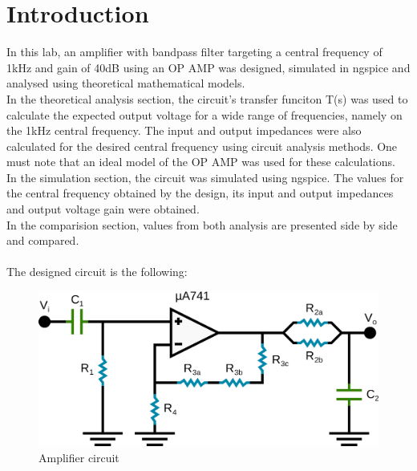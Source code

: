 \section{Introduction}
\label{sec:intro}
In this lab, an amplifier with bandpass filter targeting a central frequency of 1kHz and gain of 40dB using an OP AMP was designed, simulated in ngspice and analysed using theoretical mathematical models.\\
 In the theoretical analysis section, the circuit's transfer funciton T(s) was used to calculate the expected output voltage for a wide range of frequencies, namely on the 1kHz central frequency. The input and output impedances were also calculated for the desired central frequency using circuit analysis methods. One must note that an ideal model of the OP AMP was used for these calculations. \\
 In the simulation section, the circuit was simulated using ngspice. The values for the central frequency obtained by the design, its input and output impedances and output voltage gain were obtained.\\
In the comparision section, values from both analysis are presented side by side and compared.\\ \\
The designed circuit is the following:

\begin{figure} [!htb] 
  \includegraphics[width=\linewidth]{circuit.png}
  \vspace{1cm}
  \caption{Amplifier circuit}
  \label{fig:circuit}
  \hfill
\end{figure}



\FloatBarrier

